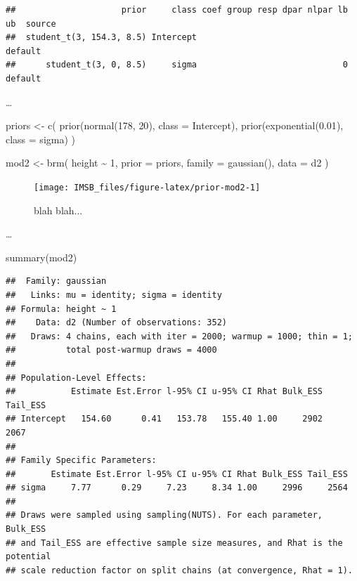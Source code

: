 \documentclass[
  a4paper,11pt,twoside,onecolumn,openright,final,oldfontcommands]{memoir}
\newenvironment{Shaded}{\begin{snugshade}}{\end{snugshade}}
\newcommand{\AttributeTok}[1]{\textcolor[rgb]{0.77,0.63,0.00}{#1}}
\newcommand{\DecValTok}[1]{\textcolor[rgb]{0.00,0.00,0.81}{#1}}
\newcommand{\FloatTok}[1]{\textcolor[rgb]{0.00,0.00,0.81}{#1}}
\newcommand{\FunctionTok}[1]{\textcolor[rgb]{0.00,0.00,0.00}{#1}}
\newcommand{\NormalTok}[1]{#1}
\newcommand{\OtherTok}[1]{\textcolor[rgb]{0.56,0.35,0.01}{#1}}
\newcommand{\SpecialCharTok}[1]{\textcolor[rgb]{0.00,0.00,0.00}{#1}}
\theoremstyle{definition}
\theoremstyle{definition}
\theoremstyle{definition}
\theoremstyle{definition}
\theoremstyle{remark}
\begin{document}
\begin{verbatim}
##                     prior     class coef group resp dpar nlpar lb ub  source
##  student_t(3, 154.3, 8.5) Intercept                                  default
##      student_t(3, 0, 8.5)     sigma                             0    default
\end{verbatim}

\ldots{}

\begin{Shaded}
\begin{Highlighting}[]
\NormalTok{priors }\OtherTok{\textless{}{-}} \FunctionTok{c}\NormalTok{(}
  \FunctionTok{prior}\NormalTok{(}\FunctionTok{normal}\NormalTok{(}\DecValTok{178}\NormalTok{, }\DecValTok{20}\NormalTok{), }\AttributeTok{class =}\NormalTok{ Intercept),}
  \FunctionTok{prior}\NormalTok{(}\FunctionTok{exponential}\NormalTok{(}\FloatTok{0.01}\NormalTok{), }\AttributeTok{class =}\NormalTok{ sigma)}
\NormalTok{  )}

\NormalTok{mod2 }\OtherTok{\textless{}{-}} \FunctionTok{brm}\NormalTok{(}
\NormalTok{  height }\SpecialCharTok{\textasciitilde{}} \DecValTok{1}\NormalTok{,}
  \AttributeTok{prior =}\NormalTok{ priors,}
  \AttributeTok{family =} \FunctionTok{gaussian}\NormalTok{(),}
  \AttributeTok{data =}\NormalTok{ d2}
\NormalTok{  )}
\end{Highlighting}
\end{Shaded}

\begin{figure}[!htb]

{\centering \texttt{[image: IMSB\_files/figure-latex/prior-mod2-1]} 

}

\caption{blah blah...}\label{fig:prior-mod2}
\end{figure}

\ldots{}

\begin{Shaded}
\begin{Highlighting}[]
\FunctionTok{summary}\NormalTok{(mod2)}
\end{Highlighting}
\end{Shaded}

\begin{verbatim}
##  Family: gaussian 
##   Links: mu = identity; sigma = identity 
## Formula: height ~ 1 
##    Data: d2 (Number of observations: 352) 
##   Draws: 4 chains, each with iter = 2000; warmup = 1000; thin = 1;
##          total post-warmup draws = 4000
## 
## Population-Level Effects: 
##           Estimate Est.Error l-95% CI u-95% CI Rhat Bulk_ESS Tail_ESS
## Intercept   154.60      0.41   153.78   155.40 1.00     2902     2067
## 
## Family Specific Parameters: 
##       Estimate Est.Error l-95% CI u-95% CI Rhat Bulk_ESS Tail_ESS
## sigma     7.77      0.29     7.23     8.34 1.00     2996     2564
## 
## Draws were sampled using sampling(NUTS). For each parameter, Bulk_ESS
## and Tail_ESS are effective sample size measures, and Rhat is the potential
## scale reduction factor on split chains (at convergence, Rhat = 1).
\end{verbatim}
\end{document}
